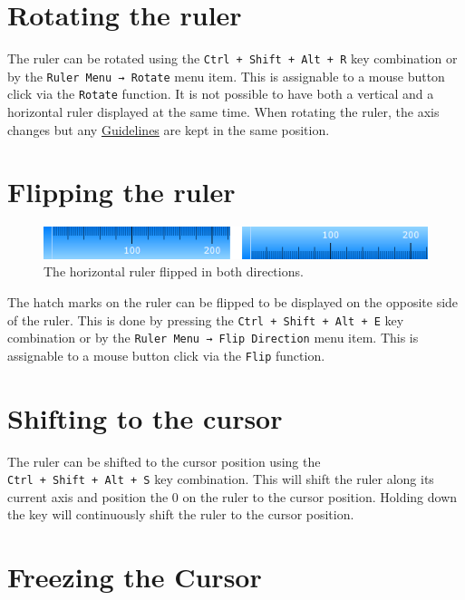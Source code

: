 \documentclass[
]{book}
\begin{document}
\hypertarget{rotate}{%
\section{Rotating the ruler}\label{rotate}}

The ruler can be rotated using the \texttt{Ctrl\ +\ Shift\ +\ Alt\ +\ R} key combination or by the \texttt{Ruler\ Menu\ →\ Rotate} menu item.
This is assignable to a mouse button click via the \texttt{Rotate} function.
It is not possible to have both a vertical and a horizontal ruler displayed at the same time.
When rotating the ruler, the axis changes but any \protect\hyperlink{guidelines}{Guidelines} are kept in the same position.

\hypertarget{flip}{%
\section{Flipping the ruler}\label{flip}}

\begin{figure}
\centering
\includegraphics{images/ruler-flipped.png}
\caption{\label{fig:unnamed-chunk-2}The horizontal ruler flipped in both directions.}
\end{figure}

The hatch marks on the ruler can be flipped to be displayed on the opposite side of the ruler.
This is done by pressing the \texttt{Ctrl\ +\ Shift\ +\ Alt\ +\ E} key combination or by the \texttt{Ruler\ Menu\ →\ Flip\ Direction} menu item.
This is assignable to a mouse button click via the \texttt{Flip} function.

\hypertarget{shifttocursor}{%
\section{Shifting to the cursor}\label{shifttocursor}}

The ruler can be shifted to the cursor position using the \texttt{Ctrl\ +\ Shift\ +\ Alt\ +\ S} key combination.
This will shift the ruler along its current axis and position the 0 on the ruler to the cursor position.
Holding down the key will continuously shift the ruler to the cursor position.

\hypertarget{freeze}{%
\section{Freezing the Cursor}\label{freeze}}
\end{document}
